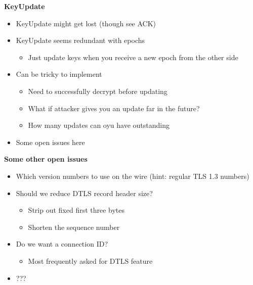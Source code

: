 \documentclass[helvetica]{seminar}
\newcommand{\heading}[1]{%
  \begin{center} 
    \large\bf 
    #1 
  \end{center} 
  \vspace{.4 in}}
\begin{document}
\begin{slide}
\heading{KeyUpdate}

\begin{itemize}
\item KeyUpdate might get lost (though see ACK)
\item KeyUpdate seems redundant with epochs
  \begin{itemize}
  \item Just update keys when you receive a new epoch from the other side
  \end{itemize}

\item Can be tricky to implement
  \begin{itemize}
  \item Need to successfully decrypt before updating
  \item What if attacker gives you an update far in the future?
  \item How many updates can oyu have outstanding
  \end{itemize}

\item Some open issues here
\end{itemize}
\end{slide}


\begin{slide}
\heading{Some other open issues}

\begin{itemize}
\item Which version numbers to use on the wire (hint: regular TLS 1.3 numbers)
\item Should we reduce DTLS record header size?
  \begin{itemize}
  \item Strip out fixed first three bytes
  \item Shorten the sequence number
  \end{itemize}
\item Do we want a connection ID?
  \begin{itemize}
  \item Most frequently asked for DTLS feature
  \end{itemize}
\item ???  
\end{itemize}

\end{slide}
\end{document}
